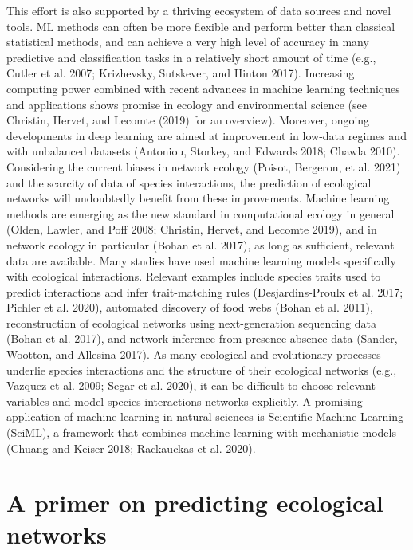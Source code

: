 \documentclass[10pt,oneside]{article}
\begin{document}
This effort is also supported by a thriving ecosystem of data sources
and novel tools. ML methods can often be more flexible and perform
better than classical statistical methods, and can achieve a very high
level of accuracy in many predictive and classification tasks in a
relatively short amount of time (e.g., Cutler et al. 2007; Krizhevsky,
Sutskever, and Hinton 2017). Increasing computing power combined with
recent advances in machine learning techniques and applications shows
promise in ecology and environmental science (see Christin, Hervet, and
Lecomte (2019) for an overview). Moreover, ongoing developments in deep
learning are aimed at improvement in low-data regimes and with
unbalanced datasets (Antoniou, Storkey, and Edwards 2018; Chawla 2010).
Considering the current biases in network ecology (Poisot, Bergeron, et
al. 2021) and the scarcity of data of species interactions, the
prediction of ecological networks will undoubtedly benefit from these
improvements. Machine learning methods are emerging as the new standard
in computational ecology in general (Olden, Lawler, and Poff 2008;
Christin, Hervet, and Lecomte 2019), and in network ecology in
particular (Bohan et al. 2017), as long as sufficient, relevant data are
available. Many studies have used machine learning models specifically
with ecological interactions. Relevant examples include species traits
used to predict interactions and infer trait-matching rules
(Desjardins-Proulx et al. 2017; Pichler et al. 2020), automated
discovery of food webs (Bohan et al. 2011), reconstruction of ecological
networks using next-generation sequencing data (Bohan et al. 2017), and
network inference from presence-absence data (Sander, Wootton, and
Allesina 2017). As many ecological and evolutionary processes underlie
species interactions and the structure of their ecological networks
(e.g., Vazquez et al. 2009; Segar et al. 2020), it can be difficult to
choose relevant variables and model species interactions networks
explicitly. A promising application of machine learning in natural
sciences is Scientific-Machine Learning (SciML), a framework that
combines machine learning with mechanistic models (Chuang and Keiser
2018; Rackauckas et al. 2020).

\hypertarget{a-primer-on-predicting-ecological-networks}{%
\section{A primer on predicting ecological
networks}\label{a-primer-on-predicting-ecological-networks}}
\end{document}
